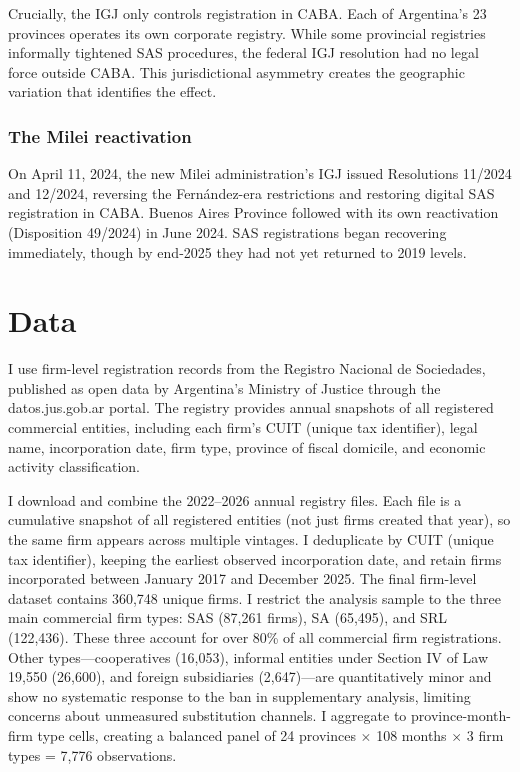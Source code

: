 \documentclass[12pt]{article}
\begin{document}
Crucially, the IGJ only controls registration in CABA. Each of Argentina's 23 provinces operates its own corporate registry. While some provincial registries informally tightened SAS procedures, the federal IGJ resolution had no legal force outside CABA. This jurisdictional asymmetry creates the geographic variation that identifies the effect.

\subsubsection*{The Milei reactivation} On April 11, 2024, the new Milei administration's IGJ issued Resolutions 11/2024 and 12/2024, reversing the Fern\'andez-era restrictions and restoring digital SAS registration in CABA. Buenos Aires Province followed with its own reactivation (Disposition 49/2024) in June 2024. SAS registrations began recovering immediately, though by end-2025 they had not yet returned to 2019 levels.


\section{Data}

I use firm-level registration records from the Registro Nacional de Sociedades, published as open data by Argentina's Ministry of Justice through the datos.jus.gob.ar portal. The registry provides annual snapshots of all registered commercial entities, including each firm's CUIT (unique tax identifier), legal name, incorporation date, firm type, province of fiscal domicile, and economic activity classification.

I download and combine the 2022--2026 annual registry files. Each file is a cumulative snapshot of all registered entities (not just firms created that year), so the same firm appears across multiple vintages. I deduplicate by CUIT (unique tax identifier), keeping the earliest observed incorporation date, and retain firms incorporated between January 2017 and December 2025. The final firm-level dataset contains 360,748 unique firms. I restrict the analysis sample to the three main commercial firm types: SAS (87,261 firms), SA (65,495), and SRL (122,436). These three account for over 80\% of all commercial firm registrations. Other types---cooperatives (16,053), informal entities under Section IV of Law 19,550 (26,600), and foreign subsidiaries (2,647)---are quantitatively minor and show no systematic response to the ban in supplementary analysis, limiting concerns about unmeasured substitution channels. I aggregate to province-month-firm type cells, creating a balanced panel of 24 provinces $\times$ 108 months $\times$ 3 firm types = 7,776 observations.
\end{document}
